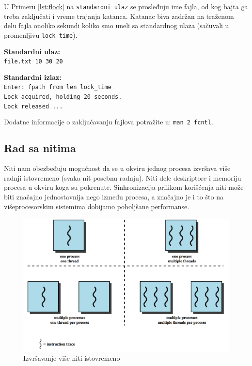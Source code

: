 \documentclass[a4paper, 11pt, twoside]{article}
\newcommand{\scode}[3] {
	\hspace{.06\textwidth} 
	\begin{minipage}[t]{.88\textwidth} %
		\begin{mdframed}[topline=true,bottomline=true,leftline=true,rightline=true,backgroundcolor=gray!22, linecolor=gray!60!black,roundcorner=1mm]
			 

	\begin{center}
		\caption{\textbf{Primer \ref{lst:#3}:} #2}
	\end{center}
	\end{mdframed}
	\end{minipage}

}
\newcommand{\stdio}[4] {
	\hspace{.06\textwidth} 
	\begin{minipage}[t]{.88\textwidth} %
		\begin{mdframed}[backgroundcolor=black!7,topline=true,bottomline=true,leftline=true,rightline=true,roundcorner=1mm]
		\begin{minipage}[t]{.5\textwidth} %
			\textbf{#1} \\
				\texttt{#3}
		\end{minipage}
		\begin{minipage}[t]{.5\textwidth} %
			\textbf{#2} \\
				\texttt{#4}
		\end{minipage}
		\end{mdframed}
	\end{minipage}
	\vspace{3mm} 
}
\begin{document}
U Primeru \ref{lst:flock} na \texttt{standardni ulaz} se prosleđuju ime fajla, od kog bajta ga treba zaključati i vreme trajanja katanca. Katanac biva zadržan na traženom delu fajla onoliko sekundi koliko smo uneli sa standardnog ulaza (sačuvali u promenljivu \texttt{lock\_time}).

\vspace{2mm} 
\scode{flock.c}{Zaključavanje fajla}{flock}
\stdio{Standardni ulaz:}{Standardni izlaz:}{\texttt{file.txt 10 30 20}}{\texttt{Enter: fpath from len lock\_time\\Lock acquired, holding 20 seconds.\\ Lock released ...}}

\vspace{3mm} 
Dodatne informacije o zaključavanju fajlova potražite u: \texttt{man 2 fcntl}.

\newpage

\subsection{Rad sa nitima}

Niti nam obezbeđuju mogućnost da se u okviru jednog procesa izvršava više radnji istovremeno (svaka nit posebnu radnju). Niti dele deskriptore i memoriju procesa u okviru koga su pokrenute. Sinhronizacija prilikom korišćenja niti može biti značajno jednostavnija nego između procesa, a značajno je i to što na višeprocesorskim sistemima dobijamo poboljšane performanse.
\vspace{3mm} 

\begin{figure}[h]
	\centering
	\includegraphics[width=.7\textwidth]{./img/mthread.png} %
	\vspace{-2mm} 
	\caption{Izvršavanje više niti istovremeno}
	\label{fig:mthread}
\end{figure}

\scode{mutex_func.c}{Funkcije za rad sa threadovima}{fthreads}	
\end{document}
